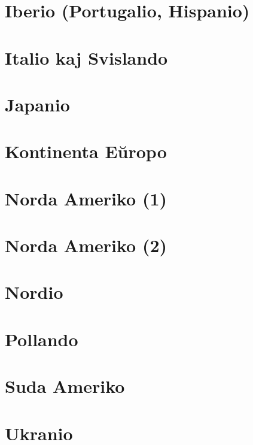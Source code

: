 \section{Iberio (Portugalio, Hispanio)}
\newpage
\section{Italio kaj Svislando}
\newpage
\section{Japanio}
\newpage
\section{Kontinenta Eŭropo}
\newpage
\section{Norda Ameriko (1)}
\newpage
\section{Norda Ameriko (2)}
\newpage
\section{Nordio}
\newpage
\section{Pollando}
\newpage
\section{Suda Ameriko}
\newpage
\section{Ukranio}
\newpage